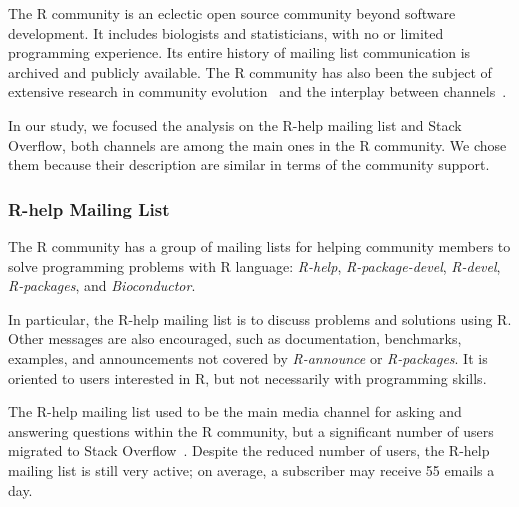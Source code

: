     The R community is an eclectic open source community beyond software development.
    It includes biologists and statisticians, with no or limited programming experience.
    Its entire history of mailing list communication is archived and publicly available.
    The R community has also been the subject of extensive research in community evolution~\cite{German2013} and the interplay between channels~\cite{Vasilescu2014c}.

    In our study, we focused the analysis on the R-help mailing list and Stack Overflow, both channels are among the main ones in the R community.
    We chose them because their description are similar in terms of the community support.

\subsubsection{R-help Mailing List}
    The R community has a group of mailing lists for helping community members to solve programming problems with R language: \emph{R-help}, \emph{R-package-devel}, \emph{R-devel}, \emph{R-packages}, and \emph{Bioconductor}.

In particular, the R-help mailing list is to discuss problems and solutions using R. 
Other messages are also encouraged, such as documentation, benchmarks, examples, and announcements not covered by \emph{R-announce} or \emph{R-packages}.
It is oriented to users interested in R, but not necessarily with programming skills.

    The R-help mailing list used to be the main media channel for asking and answering questions within the R community, but a significant number of users migrated to Stack Overflow~\cite{Vasilescu2014c}.
    Despite the reduced number of users, the R-help mailing list is still very active; on average, a subscriber may receive 55 emails a day.

